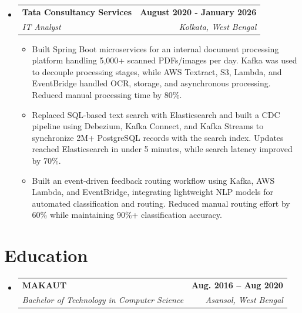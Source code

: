 \documentclass[letterpaper,11pt]{article}
\makeatletter
\newcommand{\resumeItem}[1]{
  \item\small{
    {#1 \vspace{-2pt}}
  }
}
\newcommand{\resumeSubheading}[4]{
  \vspace{-2pt}\item
    \begin{tabular*}{1.0\textwidth}[t]{l@{\extracolsep{\fill}}r}
      \textbf{#1} & \textbf{\small #2} \\
      \textit{\small#3} & \textit{\small #4} \\
    \end{tabular*}\vspace{-7pt}
}
\newcommand{\resumeSubHeadingListStart}{\begin{itemize}[leftmargin=0.0in, label={}]}
\newcommand{\resumeSubHeadingListEnd}{\end{itemize}}
\newcommand{\resumeItemListStart}{\begin{itemize}}
\newcommand{\resumeItemListEnd}{\end{itemize}\vspace{-5pt}}
\makeatother
\begin{document}
  \resumeSubHeadingListStart
    \resumeSubheading
      {Tata Consultancy Services}{August 2020 - January 2026}
      {IT Analyst}{Kolkata, West Bengal}
      \resumeItemListStart
      \vspace{4pt}
        \resumeItem{Built Spring Boot microservices for an internal document processing platform handling 5,000+ scanned PDFs/images per day. Kafka was used to decouple processing stages, while AWS Textract, S3, Lambda, and EventBridge handled OCR, storage, and asynchronous processing. Reduced manual processing time by 80\%.}
        \vspace{4pt}
        \resumeItem{Replaced SQL-based text search with Elasticsearch and built a CDC pipeline using Debezium, Kafka Connect, and Kafka Streams to synchronize 2M+ PostgreSQL records with the search index. Updates reached Elasticsearch in under 5 minutes, while search latency improved by 70\%.}
        \vspace{4pt}
        \resumeItem{Built an event-driven feedback routing workflow using Kafka, AWS Lambda, and EventBridge, integrating lightweight NLP models for automated classification and routing. Reduced manual routing effort by 60\% while maintaining 90\%+ classification accuracy.}
      \resumeItemListEnd
  \resumeSubHeadingListEnd

\vspace{-16pt}

\section{Education}
  \resumeSubHeadingListStart
    \resumeSubheading
      {MAKAUT}{Aug. 2016 -- Aug 2020}
      {Bachelor of Technology in Computer Science}{Asansol, West Bengal}
  \resumeSubHeadingListEnd
\end{document}
